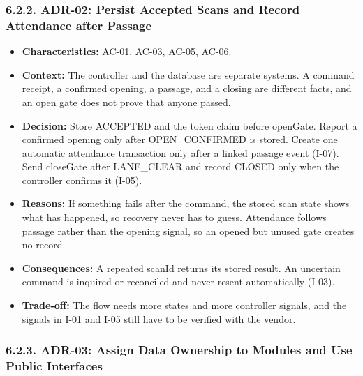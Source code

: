 \subsubsection*{6.2.2. ADR-02: Persist Accepted Scans and Record Attendance after Passage}

{}

\begin{itemize}[leftmargin=36pt, itemsep=2pt, topsep=4pt, parsep=2pt]
  \item \textbf{Characteristics:} AC-01, AC-03, AC-05, AC-06.
  \item \textbf{Context:} The controller and the database are separate systems. A command receipt, a confirmed opening, a passage, and a closing are different facts, and an open gate does not prove that anyone passed.
  \item \textbf{Decision:} Store ACCEPTED and the token claim before openGate. Report a confirmed opening only after OPEN\_CONFIRMED is stored. Create one automatic attendance transaction only after a linked passage event (I-07). Send closeGate after LANE\_CLEAR and record CLOSED only when the controller confirms it (I-05).
  \item \textbf{Reasons:} If something fails after the command, the stored scan state shows what has happened, so recovery never has to guess. Attendance follows passage rather than the opening signal, so an opened but unused gate creates no record.
  \item \textbf{Consequences:} A repeated scanId returns its stored result. An uncertain command is inquired or reconciled and never resent automatically (I-03).
  \item \textbf{Trade-off:} The flow needs more states and more controller signals, and the signals in I-01 and I-05 still have to be verified with the vendor.
\end{itemize}

\subsubsection*{6.2.3. ADR-03: Assign Data Ownership to Modules and Use Public Interfaces}

{}

